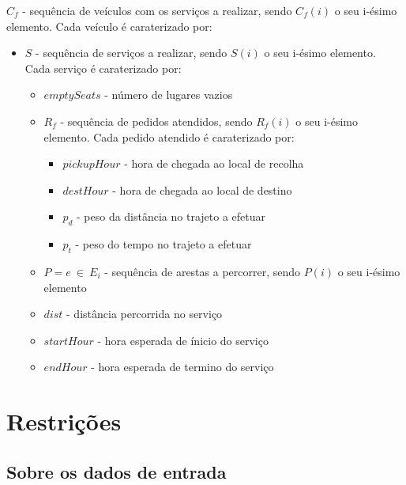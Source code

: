 \documentclass[article, a4paper, 12pt, oneside]{memoir}
\begin{document}
$C_f$ - sequência de veículos com os serviços a realizar, sendo $C_f(i)$ o seu i-ésimo elemento. Cada veículo é caraterizado por:
\begin{itemize}
	\item $S$ - sequência de serviços a realizar, sendo $S(i)$ o seu i-ésimo elemento. Cada serviço é caraterizado por:
	\begin{itemize}
		\item $emptySeats$ - número de lugares vazios
		\item $R_f$ - sequência de pedidos atendidos, sendo $R_f(i)$ o seu i-ésimo elemento. Cada pedido atendido é caraterizado por:
		\begin{itemize}
			\item $pickupHour$ - hora de chegada ao local de recolha
			\item $destHour$ - hora de chegada ao local de destino
			\item $p_d$ - peso da distância no trajeto a efetuar
			\item $p_t$ - peso do tempo no trajeto a efetuar
		\end{itemize}
		\item $P = { e ~ \in ~ E_i }$ - sequência de arestas a percorrer, sendo $P(i)$ o seu i-ésimo elemento
		\item $dist$ - distância percorrida no serviço
		\item $startHour$ - hora esperada de ínicio do serviço
		\item $endHour$ - hora esperada de termino do serviço
	\end{itemize}
\end{itemize}

\section{Restrições}

\subsection{Sobre os dados de entrada}
\end{document}
